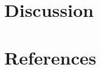 \documentclass[a4paper]{scrartcl}
\renewcommand{\_}{\textunderscore\allowbreak}
\begin{document}
\section{Discussion}
\label{sec:discussion}




\section{References}
\label{sec:references}
\end{document}
